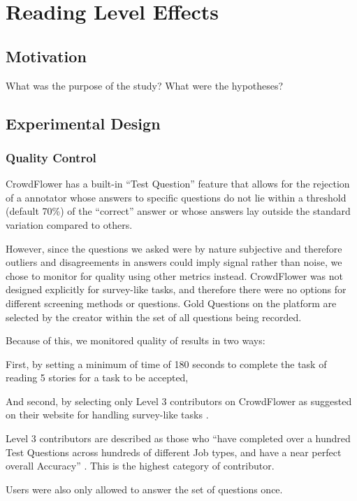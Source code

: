 \chapter{Reading Level Effects}

\section{Motivation}

What was the purpose of the study?
What were the hypotheses? 

\section{Experimental Design}
\subsection{Quality Control}

CrowdFlower has a built-in ``Test Question'' feature that allows for the rejection of a annotator whose answers to specific questions do not lie within a threshold (default 70\%) of the ``correct'' answer or whose answers lay outside the standard variation compared to others.

However, since the questions we asked were by nature subjective and therefore outliers and disagreements in answers could imply signal rather than noise, we chose to monitor for quality using other metrics instead. CrowdFlower was not designed explicitly for survey-like tasks, and therefore there were no options for different screening methods or questions. Gold Questions on the platform are selected by the creator within the set of all questions being recorded.

Because of this, we monitored quality of results in two ways:

First, by setting a minimum of time of 180 seconds to complete the task of reading 5 stories for a task to be accepted,

And second, by selecting only Level 3 contributors on CrowdFlower as suggested on their website for handling survey-like tasks \cite{CrowdFlower-guide}.

Level 3 contributors are described as those who ``have completed over a hundred Test Questions across hundreds of different Job types, and have a near perfect overall Accuracy'' \cite{Crowdflower-levels}. This is the highest category of contributor.
 
Users were also only allowed to answer the set of questions once. 

